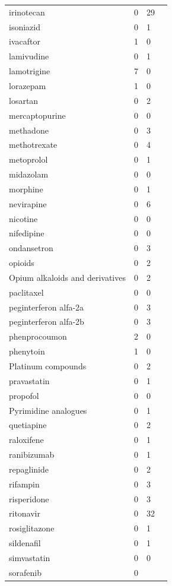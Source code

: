 \documentclass{book}
\begin{document}
\begin{tabularx}{1.3\textwidth}{XXXX}
\\irinotecan &  0 & 29 \\isoniazid &  0 & 1 \\ivacaftor &  1 & 0 \\lamivudine &  0 & 1 \\lamotrigine &  7 & 0 \\lorazepam &  1 & 0 \\losartan &  0 & 2 \\mercaptopurine &  0 & 0 \\methadone &  0 & 3 \\methotrexate &  0 & 4 \\metoprolol &  0 & 1 \\midazolam &  0 & 0 \\morphine &  0 & 1 \\nevirapine &  0 & 6 \\nicotine &  0 & 0 \\nifedipine &  0 & 0 \\ondansetron &  0 & 3 \\opioids &  0 & 2 \\Opium alkaloids and derivatives &  0 & 2 \\paclitaxel &  0 & 0 \\peginterferon alfa-2a &  0 & 3 \\peginterferon alfa-2b &  0 & 3 \\phenprocoumon &  2 & 0 \\phenytoin &  1 & 0 \\Platinum compounds &  0 & 2 \\pravastatin &  0 & 1 \\propofol &  0 & 0 \\Pyrimidine analogues &  0 & 1 \\quetiapine &  0 & 2 \\raloxifene &  0 & 1 \\ranibizumab &  0 & 1 \\repaglinide &  0 & 2 \\rifampin &  0 & 3 \\risperidone &  0 & 3 \\ritonavir &  0 & 32 \\rosiglitazone &  0 & 1 \\sildenafil &  0 & 1 \\simvastatin &  0 & 0 \\sorafenib &  0 & 
\end{tabularx}
\end{document}
